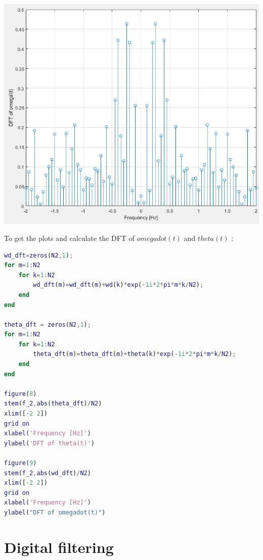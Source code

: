 \documentclass[a4paper,12pt]{article}
\begin{document}
\begin{enumerate}[label={\color{blue}\arabic*)}]
\begin{multicols}{2}
\begin{flushright}
            \includegraphics[width=1\linewidth]{Images/DFT_omega_dot.png}
            \label{Figure12}
        \end{flushright}

    \end{multicols}
    To get the plots and calculate the DFT of \(omega dot(t)\) and \(theta(t)\) :
    \begin{lstlisting}[style=Matlab-editor,language=Matlab, basicstyle=\small\ttfamily]
wd_dft=zeros(N2,1);
for m=1:N2
    for k=1:N2
        wd_dft(m)=wd_dft(m)+wd(k)*exp(-1i*2*pi*m*k/N2);
    end
end

theta_dft = zeros(N2,1);
for m=1:N2
    for k=1:N2
        theta_dft(m)=theta_dft(m)+theta(k)*exp(-1i*2*pi*m*k/N2);
    end
end

figure(8)
stem(f_2,abs(theta_dft)/N2)
xlim([-2 2])
grid on
xlabel('Frequency [Hz]')
ylabel('DFT of theta(t)')

figure(9)
stem(f_2,abs(wd_dft)/N2)
xlim([-2 2])
grid on
xlabel('Frequency [Hz]')
ylabel("DFT of omegadot(t)")
        \end{lstlisting}

\end{enumerate}

\newpage
\section{Digital filtering}
\end{document}
